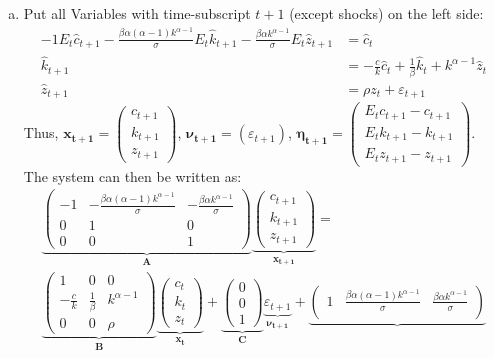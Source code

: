 \documentclass{article}
\begin{document}
\begin{enumerate}[(a)]
\item Put all Variables with time-subscript $t+1$ (except shocks) on the left side:
\begin{align*}
  -1 E_t\widehat{c}_{t+1} - \frac{\beta\alpha(\alpha-1)k^{\alpha-1}}{\sigma} E_t \widehat{k}_{t+1} - \frac{\beta \alpha k^{\alpha-1}}{\sigma} E_t \widehat{z}_{t+1} &= \widehat{c}_t\\
  \widehat{k}_{t+1} &= - \frac{c}{k}\widehat{c}_t + \frac{1}{\beta} \widehat{k}_t  + k^{\alpha-1} \widehat{z}_t\\
\widehat{z}_{t+1} &= \rho z_{t} + \varepsilon_{t+1}
\end{align*}
Thus, $\mathbf{x_{t+1}}=\begin{pmatrix} c_{t+1}\\k_{t+1}\\z_{t+1}\end{pmatrix}$, $\boldsymbol{\nu_{t+1}}=(\varepsilon_{t+1})$, $\boldsymbol{\eta_{t+1}}=\begin{pmatrix}E_t c_{t+1} - c_{t+1}\\E_t k_{t+1} - k_{t+1}\\E_t z_{t+1} - z_{t+1} \end{pmatrix}$. The system can then be written as:
\begin{align*}
  \underbrace{\begin{pmatrix} -1 & - \frac{\beta\alpha(\alpha-1)k^{\alpha-1}}{\sigma} & - \frac{\beta \alpha k^{\alpha-1}}{\sigma}\\
            0 &1&0\\
            0&0&1
  \end{pmatrix}}_{\mathbf{A}} \underbrace{\begin{pmatrix} c_{t+1}\\k_{t+1}\\z_{t+1}\end{pmatrix}}_{\mathbf{x_{t+1}}}=\\
  \underbrace{\begin{pmatrix} 1 & 0 & 0\\- \frac{c}{k}& \frac{1}{\beta} & k^{\alpha-1} \\ 0&0&\rho\end{pmatrix}}_{\mathbf{B}} \underbrace{\begin{pmatrix} c_{t}\\k_{t}\\z_{t}\end{pmatrix}}_{\mathbf{x_{t}}} +
  \underbrace{\begin{pmatrix} 0\\0\\1  \end{pmatrix}}_{\mathbf{C}} \underbrace{\varepsilon_{t+1}}_{\boldsymbol{\nu_{t+1}}} +\underbrace{\begin{pmatrix} 1 & \frac{\beta\alpha(\alpha-1)k^{\alpha-1}}{\sigma} & \frac{\beta \alpha k^{\alpha-1}}{\sigma}\\

\end{pmatrix}}
\end{align*}
\end{enumerate}
\end{document}
